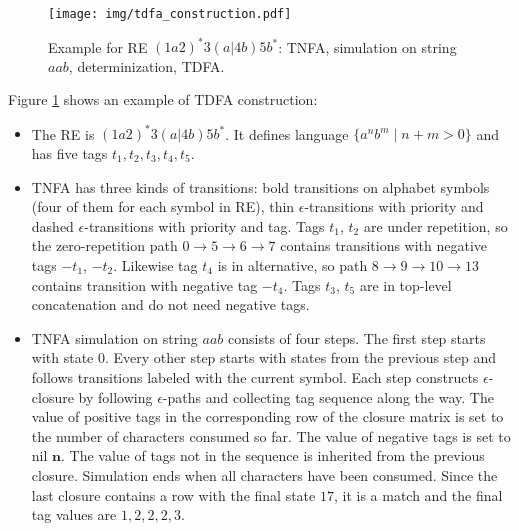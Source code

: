 \documentclass[]{article}
\begin{document}
\begin{figure}%
\texttt{[image: img/tdfa\_construction.pdf]}
\vspace{0.1em}
\caption{
Example for RE $(1a2)^*3(a|4b)5b^*$: TNFA, simulation on string $aab$, determinization, TDFA.
}\label{fig:tdfa}
\end{figure}

Figure \ref{fig:tdfa} shows an example of TDFA construction:

\medskip

\begin{itemize}

\item[\ding{212}]
The RE is $(1a2)^*3(a|4b)5b^*$. It defines language $\{a^n b^m \mid n + m > 0 \}$
and has five tags $t_1, t_2, t_3, t_4, t_5$.
\medskip

\item[\ding{212}]
TNFA has three kinds of transitions:
bold transitions on alphabet symbols (four of them for each symbol in RE),
thin $\epsilon$-transitions with priority
and dashed $\epsilon$-transitions with priority and tag.
Tags $t_1$, $t_2$ are under repetition, so the zero-repetition path $0 \!\rightarrow\! 5 \!\rightarrow\! 6 \!\rightarrow\! 7$ contains transitions with negative tags $-t_1$, $-t_2$.
Likewise tag $t_4$ is in alternative, so path $8 \!\rightarrow\! 9 \!\rightarrow\! 10 \!\rightarrow\! 13$ contains transition with negative tag $-t_4$.
Tags $t_3$, $t_5$ are in top-level concatenation and do not need negative tags.
\medskip

\item[\ding{212}]
TNFA simulation on string $aab$ consists of four steps.
The first step starts with state $0$.
Every other step starts with states from the previous step and follows transitions labeled with the current symbol.
Each step constructs $\epsilon$-closure by following $\epsilon$-paths and collecting tag sequence along the way.
The value of positive tags in the corresponding row of the closure matrix is set to the number of characters consumed so far.
The value of negative tags is set to nil $\mathbf{n}$.
The value of tags not in the sequence is inherited from the previous closure.
Simulation ends when all characters have been consumed.
Since the last closure contains a row with the final state $17$, it is a match and the final tag values are $1, 2, 2, 2, 3$.
\medskip


\end{itemize}
\end{document}
